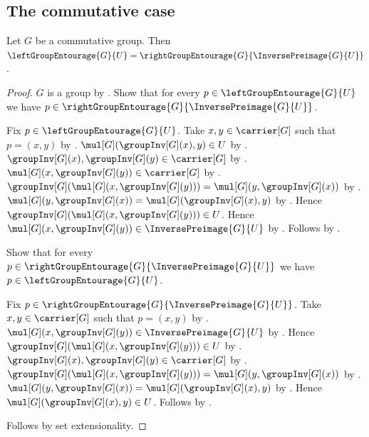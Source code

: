 \subsection{The commutative case}

\begin{proposition}\label{commutative_left_group_entourage_as_right}
    Let $G$ be a commutative group.
    Then $\leftGroupEntourage{G}{U}
        =\rightGroupEntourage{G}{\InversePreimage{G}{U}}$.
\end{proposition}
\begin{proof}
    $G$ is a group by .
    Show that for every $p\in\leftGroupEntourage{G}{U}$ we have
        $p\in\rightGroupEntourage{G}{\InversePreimage{G}{U}}$.
    \begin{subproof}
        Fix $p\in\leftGroupEntourage{G}{U}$.
        Take $x,y\in\carrier[G]$ such that $p=(x,y)$
            by .
        $\mul[G](\groupInv[G](x),y)\in U$
            by .
        $\groupInv[G](x),\groupInv[G](y)\in\carrier[G]$
            by .
        $\mul[G](x,\groupInv[G](y))\in\carrier[G]$
            by .
        $\groupInv[G](\mul[G](x,\groupInv[G](y)))
            =\mul[G](y,\groupInv[G](x))$
            by .
        $\mul[G](y,\groupInv[G](x))
            =\mul[G](\groupInv[G](x),y)$
            by .
        Hence $\groupInv[G](\mul[G](x,\groupInv[G](y)))\in U$.
        Hence $\mul[G](x,\groupInv[G](y))
            \in\InversePreimage{G}{U}$ by .
        Follows by .
    \end{subproof}
    Show that for every
        $p\in\rightGroupEntourage{G}{\InversePreimage{G}{U}}$ we have
        $p\in\leftGroupEntourage{G}{U}$.
    \begin{subproof}
        Fix $p\in\rightGroupEntourage{G}{\InversePreimage{G}{U}}$.
        Take $x,y\in\carrier[G]$ such that $p=(x,y)$
            by .
        $\mul[G](x,\groupInv[G](y))
            \in\InversePreimage{G}{U}$
            by .
        Hence $\groupInv[G](\mul[G](x,\groupInv[G](y)))\in U$
            by .
        $\groupInv[G](x),\groupInv[G](y)\in\carrier[G]$
            by .
        $\groupInv[G](\mul[G](x,\groupInv[G](y)))
            =\mul[G](y,\groupInv[G](x))$
            by .
        $\mul[G](y,\groupInv[G](x))
            =\mul[G](\groupInv[G](x),y)$
            by .
        Hence $\mul[G](\groupInv[G](x),y)\in U$.
        Follows by .
    \end{subproof}
    Follows by set extensionality.
\end{proof}

